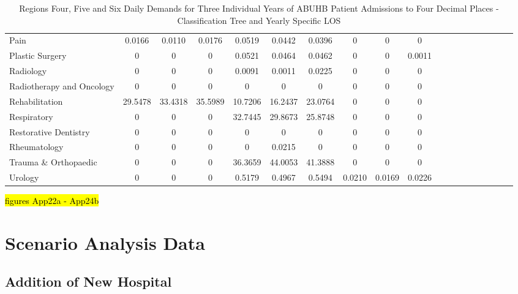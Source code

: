 \documentclass[thesis.tex]{subfiles}
\begin{document}
\begin{landscape}
\begin{table}[h!]
{\begin{tabular}{lcccccccccccccccccc}
Pain	&0.0166	&0.0110	&0.0176	&0.0519	&0.0442&	0.0396&	0	&0	&0\\
Plastic Surgery	&0	&0	&0&0.0521	&0.0464	&0.0462	&0	&0	&0.0011\\
Radiology	&0&	0	&0&	0.0091	&0.0011&	0.0225&	0&	0&	0\\
Radiotherapy and Oncology	&0	&0	&0	&0	&0&	0	&0&	0&	0\\
Rehabilitation	&29.5478	&33.4318	&35.5989&10.7206	&16.2437&	23.0764	&0	&0	&0\\
Respiratory&	0&	0&	0&	32.7445	&29.8673	&25.8748&	0&	0	&0\\
Restorative Dentistry	&0	&0	&0	&0&	0&	0&	0	&0	&0\\
Rheumatology	&0&	0	&0	&0	&0.0215&	0&	0&	0	&0\\
Trauma \& Orthopaedic	&0&	0	&0	&36.3659&	44.0053	&41.3888	&0	&0&	0\\
Urology	&0	&0	&0	&0.5179	&0.4967	&0.5494	&0.0210	&0.0169&	0.0226\\\bottomrule
\end{tabular}  } 
\caption{Regions Four, Five and Six Daily Demands for Three Individual Years of ABUHB Patient Admissions to Four Decimal Places - Classification Tree and Yearly Specific LOS}
    \label{apptab:LinkedDemands10b}
\end{table}  
\end{landscape}
\hl{figures App22a - App24b}


\section{Scenario Analysis Data}

\subsection{Addition of New Hospital}
\end{document}
